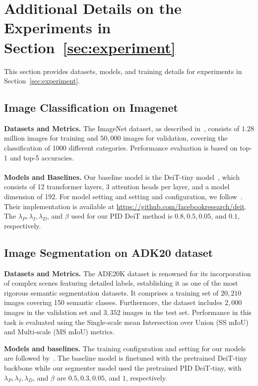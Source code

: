 \section{Additional Details on the Experiments in Section~\ref{sec:experiment}}
\label{secapp:experiments}
This section provides datasets, models, and training details for experiments in Section~\ref{sec:experiment}. 
\subsection{Image Classification on Imagenet}
\textbf{Datasets and Metrics.} The ImageNet dataset, as described in~\cite{deng2009imagenet, russakovsky2015imagenet}, consists of $1.28$ million images for training and $50,000$ images for validation, covering the classification of 1000 different categories. Performance evaluation is based on top-1 and top-5 accuracies. \\\\
\textbf{Models and Baselines.} Our baseline model is the DeiT-tiny model~\cite{touvron2020deit}, which consists of 12 transformer layers, 3 attention heads per layer, and a model dimension of 192. For model setting and setting and configuration, we follow~\cite{touvron2020deit}. Their implementation is available at \href{https://github.com/facebookresearch/deit}{https://github.com/facebookresearch/deit}. The $\lambda_P, \lambda_I, \lambda_D$, and $\beta$ used for our PID DeiT method is $0.8, 0.5, 0.05$, and $0.1$, respectively.
\subsection{Image Segmentation on ADK20 dataset}
\textbf{Datasets and Metrics.} 
The ADE20K dataset is renowned for its incorporation of complex scenes featuring detailed labels, establishing it as one of the most rigorous semantic segmentation datasets. It comprises a training set of $20,210$ images covering 150 semantic classes. Furthermore, the dataset includes $2,000$ images in the validation set and $3,352$ images in the test set. Performance in this task is evaluated using the Single-scale mean Intersection over Union (SS mIoU) and Multi-scale (MS mIoU) metrics.

\textbf{Models and baselines.}
The training configuration and setting for our models are followed by~\cite{strudel2021segmenter}. The baseline model is finetuned with the pretrained DeiT-tiny backbone while our segmenter model used the pretrained PID DeiT-tiny, with $\lambda_P, \lambda_I, \lambda_D$, and $\beta$ are $0.5, 0.3, 0.05$, and $1$, respectively.
